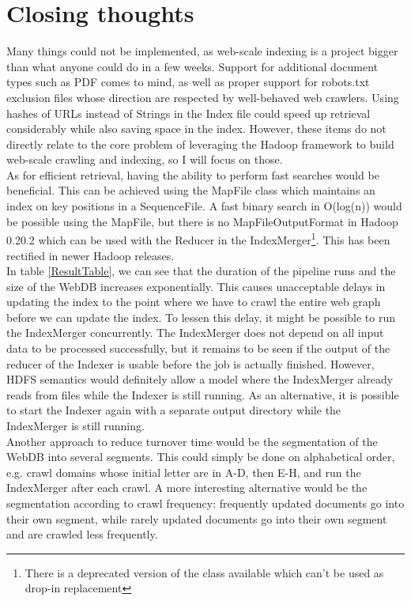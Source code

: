 \documentclass[10pt,a4paper]{report}
\begin{document}
\section*{Closing thoughts}
Many things could not be implemented, as web-scale indexing is a project bigger than what anyone could do in a few weeks. Support for additional document types
such as PDF comes to mind, as well as proper support for robots.txt exclusion files whose direction are respected by well-behaved web crawlers. Using hashes of URLs instead of Strings in the Index file could speed up retrieval considerably while also saving space in the index. However,
these items do not directly relate to the core problem of leveraging the Hadoop framework to build web-scale crawling and indexing, so I will focus on those.
\\
As for efficient retrieval, having the ability to perform fast searches would be beneficial. This can be achieved using the MapFile class which maintains an index on
key positions in a SequenceFile. A fast binary search in O(log(n)) would be possible using the MapFile, but there is no MapFileOutputFormat in Hadoop 0.20.2 which can be used with the Reducer in the IndexMerger\footnote{There is a deprecated version of the class available which can't be used as drop-in replacement}. This has been rectified in newer Hadoop releases.
\\
In table \ref{ResultTable}, we can see that the duration of the pipeline runs and the size of the WebDB increases exponentially. This causes unacceptable delays in updating the index to the point where we have to crawl the entire web graph before we can update the index. To lessen this delay, it might be possible to run the IndexMerger concurrently. The IndexMerger does not depend on all input data to be processed successfully, but it remains to be seen if the output of
the reducer of the Indexer is usable before the job is actually finished. However, HDFS semantics would definitely allow a model where the IndexMerger already reads from files while
the Indexer is still running. As an alternative, it is possible to start the Indexer again with a separate output directory while the IndexMerger is still running.
\\
Another approach to reduce turnover time would be the segmentation of the WebDB into several segments. This could simply be done on alphabetical order, e.g.
crawl domains whose initial letter are in A-D, then E-H, and run the IndexMerger after each crawl.
A more interesting alternative would be the segmentation according to crawl frequency: frequently updated documents go into their own segment, while rarely updated documents go into their own segment and are crawled less frequently.
\end{document}
